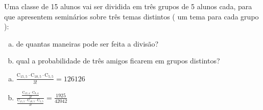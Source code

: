 \begin{ex}
 Uma classe de 15 alunos vai ser dividida em três grupos de 5 alunos cada, para que apresentem seminários sobre três temas distintos ( um tema para cada grupo ):
    \begin{enumerate}[(a)]
    \item de quantas maneiras pode ser feita a divisão?
    \item qual a probabilidade de três amigos ficarem em grupos distintos?
    \end{enumerate}
      \begin{sol}
          \phantom{A} 
        \begin{enumerate} [(a)]
            \item $\frac{\mathrm{C}_{{15},5}\cdot\mathrm{C}_{{10},5}\cdot\mathrm{C}_{5,5}}{3!}=126126$
            \item $\frac{\frac{\mathrm{C}_{{12},4}\cdot\mathrm{C}_{8,4}}{3!}}{{\frac{\mathrm{C}_{{15},5}\cdot\mathrm{C}_{{10},5}\cdot\mathrm{C}_{5,5}}{3!}}}=\frac{1925}{42042}$
        \end{enumerate}
      \end{sol}
\end{ex}